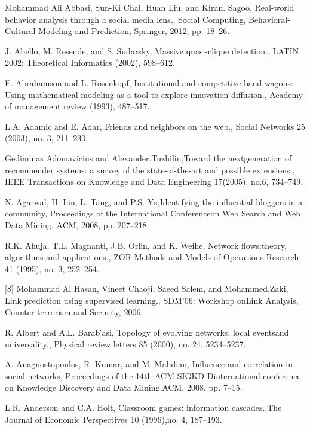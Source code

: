 \begin{thebibliography}{999}
 Mohammad Ali Abbasi, Sun-Ki Chai, Huan Liu, and Kiran. Sagoo, Real-world behavior analysis through a social media lens., Social Computing, Behavioral-Cultural Modeling and Prediction, Springer, 2012, pp. 18–26.

 J. Abello, M. Resende, and S. Sudarsky, Massive quasi-clique detection., LATIN 2002: Theoretical Informatics (2002), 598–612.

 E. Abrahamson and L. Rosenkopf, Institutional and competitive band wagons: Using mathematical modeling as a tool to explore innovation diffusion., Academy of management review (1993), 487–517.

 L.A. Adamic and E. Adar, Friends and neighbors on the web., Social Networks 25 (2003), no. 3, 211–230.


 Gediminas Adomavicius and Alexander.Tuzhilin,Toward the nextgeneration of recommender systems: a survey of the state-of-the-art and possible extensions., IEEE Transactions on Knowledge and Data Engineering 17(2005), no.6, 734–749.

 N. Agarwal, H. Liu, L. Tang, and P.S. Yu,Identifying the influential bloggers in a community, Proceedings of the International Conferenceon Web Search and Web Data Mining, ACM, 2008, pp. 207–218.

 R.K. Ahuja, T.L. Magnanti, J.B. Orlin, and K. Weihe, Network flows:theory, algorithms and applications., ZOR-Methods and Models of Operations Research 41 (1995), no. 3, 252–254.

 [8] Mohammad Al Hasan, Vineet Chaoji, Saeed Salem, and Mohammed.Zaki, Link prediction using supervised learning., SDM’06: Workshop onLink Analysis, Counter-terrorism and Security, 2006.

 R. Albert and A.L. Barab′asi, Topology of evolving networks: local eventsand universality., Physical review letters 85 (2000), no. 24, 5234–5237.

 A. Anagnostopoulos, R. Kumar, and M. Mahdian, Influence and correlation in social networks, Proceedings of the 14th ACM SIGKD Dinternational conference on Knowledge Discovery and Data Mining,ACM, 2008, pp. 7–15.

 L.R. Anderson and C.A. Holt, Classroom games: information cascades.,The Journal of Economic Perspectives 10 (1996),no. 4, 187–193.


\end{thebibliography}
